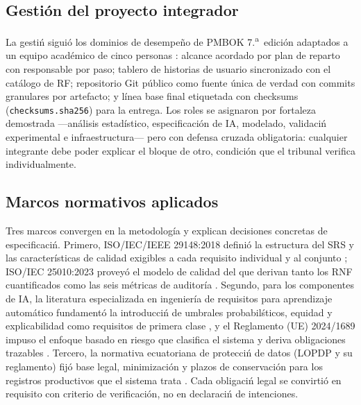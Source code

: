 \subsection{Gesti\'on del proyecto integrador}

La gesti\'n sigui\'o los dominios de desempe\~no de PMBOK 7.\textsuperscript{a}~edici\'on adaptados a un equipo acad\'emico de cinco personas \cite{pmbok7}: alcance acordado por plan de reparto con responsable por paso; tablero de historias de usuario sincronizado con el cat\'alogo de RF; repositorio Git p\'ublico como fuente \'unica de verdad con commits granulares por artefacto; y l\'inea base final etiquetada con checksums (\texttt{checksums.sha256}) para la entrega. Los roles se asignaron por fortaleza demostrada ---an\'alisis estad\'istico, especificaci\'on de IA, modelado, validaci\'n experimental e infraestructura--- pero con defensa cruzada obligatoria: cualquier integrante debe poder explicar el bloque de otro, condici\'on que el tribunal verifica individualmente.

\subsection{Marcos normativos aplicados}

Tres marcos convergen en la metodolog\'ia y explican decisiones concretas de especificaci\'n. Primero, ISO/IEC/IEEE 29148:2018 defini\'o la estructura del SRS y las caracter\'isticas de calidad exigibles a cada requisito individual y al conjunto \cite{iso29148}; ISO/IEC 25010:2023 provey\'o el modelo de calidad del que derivan tanto los RNF cuantificados como las seis m\'etricas de auditor\'ia \cite{iso25010}. Segundo, para los componentes de IA, la literatura especializada en ingenier\'ia de requisitos para aprendizaje autom\'atico fundament\'o la introducci\'n de umbrales probabil\'sticos, equidad y explicabilidad como requisitos de primera clase \cite{vogelsang2019,ahmad2023}, y el Reglamento (UE) 2024/1689 impuso el enfoque basado en riesgo que clasifica el sistema y deriva obligaciones trazables \cite{eu20241689}. Tercero, la normativa ecuatoriana de protecci\'n de datos (LOPDP y su reglamento) fij\'o base legal, minimizaci\'on y plazos de conservaci\'on para los registros productivos que el sistema trata \cite{lopdp2021,decreto904}. Cada obligaci\'n legal se convirti\'o en requisito con criterio de verificaci\'on, no en declaraci\'n de intenciones.
